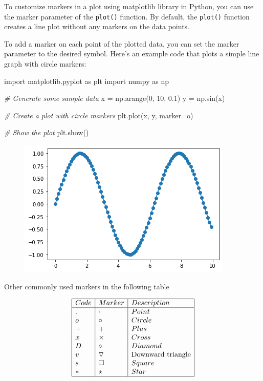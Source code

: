 \documentclass[11pt]{article}
\newenvironment{Shaded}{}{}
\newcommand{\DecValTok}[1]{\textcolor[rgb]{0.25,0.63,0.44}{{#1}}}
\newcommand{\FloatTok}[1]{\textcolor[rgb]{0.25,0.63,0.44}{{#1}}}
\newcommand{\StringTok}[1]{\textcolor[rgb]{0.25,0.44,0.63}{{#1}}}
\newcommand{\CommentTok}[1]{\textcolor[rgb]{0.38,0.63,0.69}{\textit{{#1}}}}
\newcommand{\NormalTok}[1]{{#1}}
\newcommand{\ImportTok}[1]{{#1}}
\newcommand{\OperatorTok}[1]{\textcolor[rgb]{0.40,0.40,0.40}{{#1}}}
\begin{document}
To customize markers in a plot using matplotlib library in Python, you
can use the marker parameter of the \texttt{plot()} function. By
default, the \texttt{plot()} function creates a line plot without any
markers on the data points.

To add a marker on each point of the plotted data, you can set the
marker parameter to the desired symbol. Here's an example code that
plots a simple line graph with circle markers:

\begin{Shaded}
\begin{Highlighting}[]
\ImportTok{import}\NormalTok{ matplotlib.pyplot }\ImportTok{as}\NormalTok{ plt}
\ImportTok{import}\NormalTok{ numpy }\ImportTok{as}\NormalTok{ np}

\CommentTok{\# Generate some sample data}
\NormalTok{x }\OperatorTok{=}\NormalTok{ np.arange(}\DecValTok{0}\NormalTok{, }\DecValTok{10}\NormalTok{, }\FloatTok{0.1}\NormalTok{)}
\NormalTok{y }\OperatorTok{=}\NormalTok{ np.sin(x)}

\CommentTok{\# Create a plot with circle markers}
\NormalTok{plt.plot(x, y, marker}\OperatorTok{=}\StringTok{\textquotesingle{}o\textquotesingle{}}\NormalTok{)}

\CommentTok{\# Show the plot}
\NormalTok{plt.show()}
\end{Highlighting}
\end{Shaded}

\begin{figure}
\centering
\includegraphics[scale=0.6]{marker_o.png}
\end{figure}

Other commonly used markers in the following table

$$\begin{array}{|l|l|l|}
\hline
Code & Marker & Description \\
\hline
. & \cdot & Point \\
o & \circ & Circle \\
+ & + & Plus \\
x & \times & Cross \\
D & \diamond & Diamond \\
v & \triangledown & \text{Downward triangle} \\
s & \Box & Square \\
* & \star & Star \\
\hline
\end{array}$$
\end{document}
